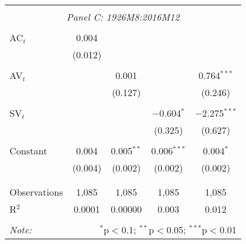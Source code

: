\begin{table}[!htbp]
\begin{adjustbox}{height=4in,width=6in}
\begin{tabular}{@{\extracolsep{5pt}}lcccc}
			\hline 
			\hline \\[-1.8ex] 
			\multicolumn{5}{c}{\textit{Panel C: 1926M8:2016M12}} \\
			\cline{2-5}
			\hline \\[-1.8ex] 
			  AC$_{t}$ & 0.004 &  &  &  \\ 
			  & (0.012) &  &  &  \\ 
			  & & & & \\ 
			  AV$_{t}$ &  & 0.001 &  & 0.764$^{***}$ \\ 
			  &  & (0.127) &  & (0.246) \\ 
			  & & & & \\ 
			  SV$_{t}$ &  &  & $-$0.604$^{*}$ & $-$2.275$^{***}$ \\ 
			  &  &  & (0.325) & (0.627) \\ 
			  & & & & \\ 
			  Constant & 0.004 & 0.005$^{**}$ & 0.006$^{***}$ & 0.004$^{*}$ \\ 
			  & (0.004) & (0.002) & (0.002) & (0.002) \\ 
			  & & & & \\ 
			  \hline \\[-1.8ex] 
			  Observations & 1,085 & 1,085 & 1,085 & 1,085 \\ 
			  R$^{2}$ & 0.0001 & 0.00000 & 0.003 & 0.012 \\ 
			\hline 
			\hline \\[-1.8ex] 
			\textit{Note:}  & \multicolumn{4}{r}{$^{*}$p$<$0.1; $^{**}$p$<$0.05; $^{***}$p$<$0.01} \\ 
		\end{tabular}
	\end{adjustbox}
\end{table} 
